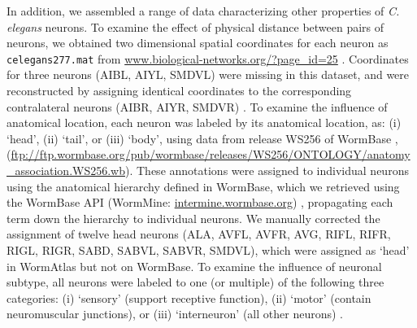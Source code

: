 \documentclass[10pt,letterpaper]{article}
\begin{document}
In addition, we assembled a range of data characterizing other properties of \emph{C. elegans} neurons.
To examine the effect of physical distance between pairs of neurons, we obtained two dimensional spatial coordinates for each neuron as \texttt{celegans277.mat} from \url{www.biological-networks.org/?page_id=25} \cite{choe2004network}.
Coordinates for three neurons (AIBL, AIYL, SMDVL) were missing in this dataset, and were reconstructed by assigning identical coordinates to the corresponding contralateral neurons (AIBR, AIYR, SMDVR) \cite{Varier2011}.
To examine the influence of anatomical location, each neuron was labeled by its anatomical location, as:
(i) `head', (ii) `tail', or (iii) `body', using data from release WS256 of WormBase \cite{Harris:2009kd}, (\url{ftp://ftp.wormbase.org/pub/wormbase/releases/WS256/ONTOLOGY/anatomy_association.WS256.wb}).
These annotations were assigned to individual neurons using the anatomical hierarchy defined in WormBase, which we retrieved using the WormBase API (WormMine: \url{intermine.wormbase.org}) \cite{Harris:2009kd}, propagating each term down the hierarchy to individual neurons.
We manually corrected the assignment of twelve head neurons (ALA, AVFL, AVFR, AVG, RIFL, RIFR, RIGL, RIGR, SABD, SABVL, SABVR, SMDVL), which were assigned as `head' in WormAtlas \cite{WormAtlas} but not on WormBase.
To examine the influence of neuronal subtype, all neurons were labeled to one (or multiple) of the following three categories:
(i) `sensory' (support receptive function),
(ii) `motor' (contain neuromuscular junctions), or
(iii) `interneuron' (all other neurons) \cite{White:1986tx}.
\end{document}
